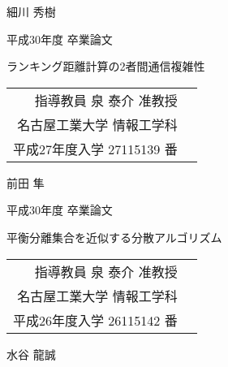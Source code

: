 \begin{titlepage}
\begin{center}
{\LARGE 細川 秀樹}

\vspace*{2cm}
\noindent

{\Large 平成30年度 卒業論文}

\vspace{0.15cm}

{\LARGE ランキング距離計算の2者間通信複雑性}

{\Large 
\vspace{2cm}
\begin{tabular}{rl}
指導教員 泉 泰介 准教授\\
名古屋工業大学 情報工学科\\
平成27年度入学 27115139 番
\end{tabular}}

{\LARGE 前田 隼}

\vspace*{2cm}
\noindent
\newpage


{\Large 平成30年度 卒業論文}

\vspace{0.15cm}

{\LARGE 平衡分離集合を近似する分散アルゴリズム}

{\Large 
\vspace{2cm}
\begin{tabular}{rl}
指導教員 泉 泰介 准教授\\
名古屋工業大学 情報工学科\\
平成26年度入学 26115142 番
\end{tabular}}

{\LARGE 水谷 龍誠}

\vspace*{2cm}
\noindent


\end{center}
\end{titlepage}
